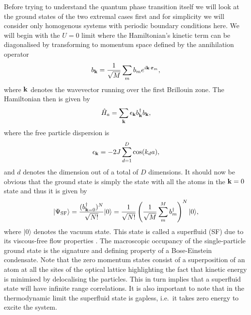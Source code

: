 Before trying to understand the quantum phase transition itself we
will look at the ground states of the two extremal cases first and for
simplicity we will consider only homogenous systems with periodic
boundary conditions here. We will begin with the $U = 0$ limit where
the Hamiltonian's kinetic term can be diagonalised by transforming to
momentum space defined by the annihilation operator
\begin{equation}
  b_{\mathbf{k}} = \frac{1} {\sqrt{M}} \sum_m b_m e^{i \mathbf{k} \cdot \mathbf{r}_m},
\end{equation}
where $\mathbf{k}$ denotes the wavevector running over the first Brillouin
zone. The Hamiltonian then is given by
\begin{equation}
  \hat{H}_a = \sum_{\mathbf{k}} \epsilon_{\mathbf{k}} b^\dagger_{\mathbf{k}} b_{\mathbf{k}},
\end{equation}
where the free particle dispersion is
\begin{equation}
  \epsilon_{\mathbf{k}} = -2 J \sum_{d = 1}^D \cos(k_d a),
\end{equation}
and $d$ denotes the dimension out of a total of $D$ dimensions. It
should now be obvious that the ground state is simply the state with
all the atoms in the $\mathbf{k} = 0$ state and thus it is given by
\begin{equation}
  \label{eq:GSSF}
  | \Psi_\mathrm{SF} \rangle = \frac{ ( b^\dagger_{\mathbf{k} = 0} )^N } {\sqrt{N!}} | 0
  \rangle = \frac{1} {\sqrt{N!}} \left( \frac{1} {\sqrt{M}} \sum_m^M
    b^\dagger_m \right)^N | 0 \rangle,
\end{equation}
where $| 0 \rangle$ denotes the vacuum state. This state is called a
superfluid (SF) due to its viscous-free flow properties
\cite{leggett1999}. The macroscopic occupancy of the single-particle
ground state is the signature and defining property of a
Bose-Einstein condensate. Note that the zero momentum states consist of a
superposition of an atom at all the sites of the optical lattice
highlighting the fact that kinetic energy is minimised by delocalising
the particles. This in turn implies that a superfluid state will have
infinite range correlations. It is also important to note that in the
thermodynamic limit the superfluid state is gapless, i.e.~it takes
zero energy to excite the system.

